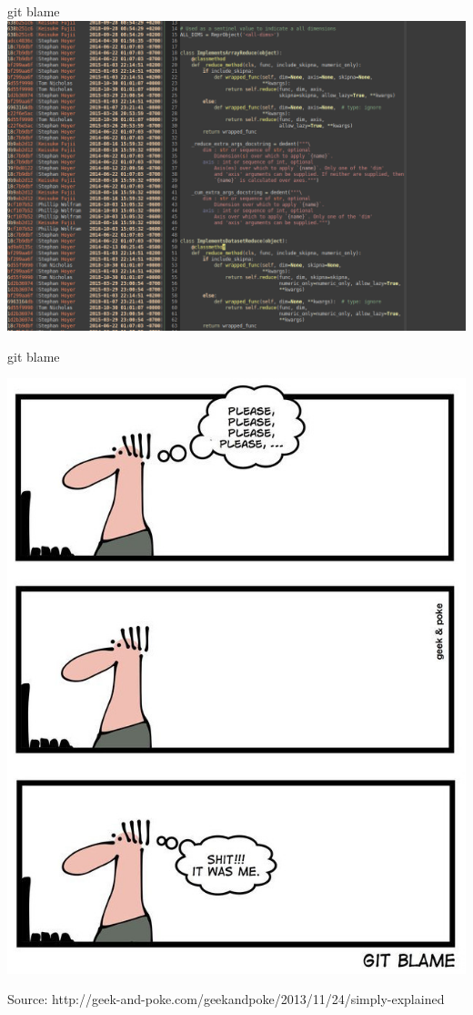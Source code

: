 \begin{frame}[fragile]{git blame}
    \includegraphics[width=\textwidth]{images/git-blame-screenshot.png}
\end{frame}


\begin{frame}[fragile]{git blame}
    \begin{center}
        \includegraphics[height=0.85\textheight]{images/git-blame2.jpg}
    \end{center}
    \vfill\pause
    {\tiny Source: http://geek-and-poke.com/geekandpoke/2013/11/24/simply-explained}
\end{frame}


